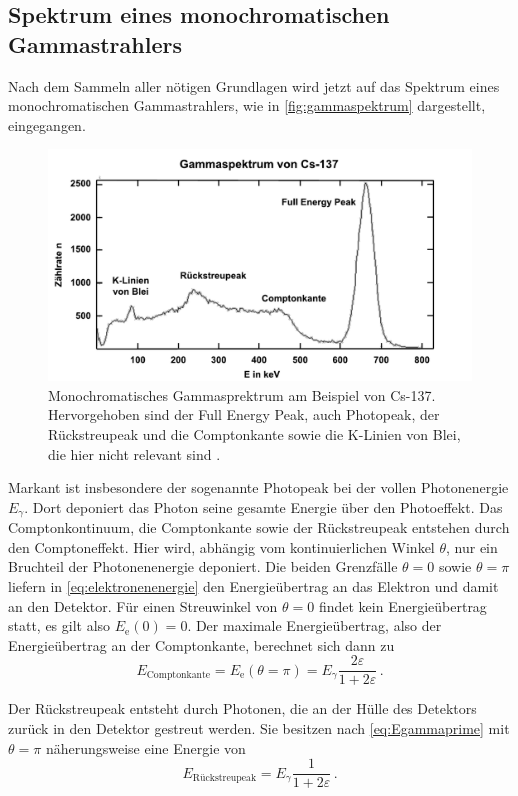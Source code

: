 \subsection{Spektrum eines monochromatischen Gammastrahlers}

Nach dem Sammeln aller nötigen Grundlagen wird jetzt auf das Spektrum eines monochromatischen Gammastrahlers, wie in \autoref{fig:gammaspektrum} dargestellt, eingegangen.

\begin{figure}[H]
    \centering
    \includegraphics[width=.9\textwidth]{figures/Gammaspektrum.pdf}
    \caption{Monochromatisches Gammasprektrum am Beispiel von Cs-137. Hervorgehoben sind der Full Energy Peak, auch Photopeak,
    der Rückstreupeak und die Comptonkante sowie die K-Linien von Blei, die hier nicht relevant sind \cite{gammaspektrum}.}
    \label{fig:gammaspektrum}
\end{figure}

Markant ist insbesondere der sogenannte Photopeak bei der vollen Photonenergie $E_\gamma$.
Dort deponiert das Photon seine gesamte Energie über den Photoeffekt.
Das Comptonkontinuum, die Comptonkante sowie der Rückstreupeak entstehen durch den Comptoneffekt.
Hier wird, abhängig vom kontinuierlichen Winkel $\theta$, nur ein Bruchteil der Photonenenergie deponiert.
Die beiden Grenzfälle $\theta = 0$ sowie $\theta = \pi$ liefern in \eqref{eq:elektronenenergie} den Energieübertrag an das Elektron und damit an den Detektor.
Für einen Streuwinkel von $\theta = 0$ findet kein Energieübertrag statt, es gilt also $E_\text{e}(0) = 0$.
Der maximale Energieübertrag, also der Energieübertrag an der Comptonkante, berechnet sich dann zu
\begin{equation}
    E_\text{Comptonkante} = E_\text{e} (\theta = \pi) = E_\gamma \frac{2 \varepsilon}{1 + 2 \varepsilon} \,.
    \label{eq:Comptonpeak}
\end{equation}

Der Rückstreupeak entsteht durch Photonen, die an der Hülle des Detektors zurück in den Detektor gestreut werden.
Sie besitzen nach \eqref{eq:Egammaprime} mit $\theta = \pi$ näherungsweise eine Energie von
\begin{equation}
    E_\text{Rückstreupeak} = E_\gamma \frac{1}{1 + 2 \varepsilon} \,.
    \label{eq:Rückstreupeak}
\end{equation}







